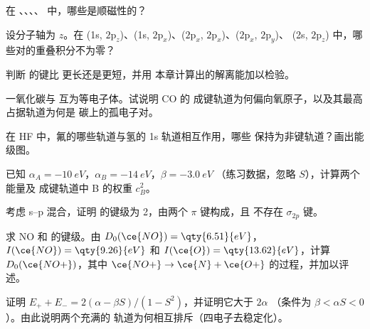 \begin{exercise}[$\star$]\label{exo:b2:diatomic-mos:3}
在 、、、、 中，哪些是顺磁性的？
\end{exercise}

\begin{exercise}[$\star$]\label{exo:b2:diatomic-mos:4}
设分子轴为 $z$。在 (1s, $2\mathrm p_z$)、(1s,
$2\mathrm p_x$)、($2\mathrm p_x$, $2\mathrm p_x$)、($2\mathrm p_x$, $2\mathrm p_y$)、
(2s, $2\mathrm p_z$) 中，哪些对的重叠积分不为零？
\end{exercise}

\begin{exercise}[$\star\star$]\label{exo:b2:diatomic-mos:5}
判断  的键比  更长还是更短，并用
本章计算出的解离能加以检验。
\end{exercise}

\begin{exercise}[$\star\star$]\label{exo:b2:diatomic-mos:6}
一氧化碳与  互为等电子体。试说明 CO 的
成键轨道为何偏向氧原子，以及其最高占据轨道为何是
碳上的孤电子对。
\end{exercise}

\begin{exercise}[$\star\star$]\label{exo:b2:diatomic-mos:7}
在 HF 中，氟的哪些轨道与氢的 1s 轨道相互作用，哪些
保持为非键轨道？画出能级图。
\end{exercise}

\begin{exercise}[$\star\star$]\label{exo:b2:diatomic-mos:8}
已知 $\alpha_A = \qty{-10}{eV}$，$\alpha_B = \qty{-14}{eV}$，$\beta = \qty{-3.0}{eV}$
（练习数据，忽略 $S$），计算两个能量及
成键轨道中 B 的权重 $c_B^2$。
\end{exercise}

\begin{exercise}[$\star\star$]\label{exo:b2:diatomic-mos:9}
考虑 s--p 混合，证明  的键级为 2，由两个 $\pi$ 键构成，且
不存在 $\sigma_{2p}$ 键。
\end{exercise}

\begin{exercise}[$\star\star\star$]\label{exo:b2:diatomic-mos:10}
求 NO 和  的键级。由 $D_0(\ce{NO}) = \qty{6.51}{eV}$，$I(\ce{NO}) =
\qty{9.26}{eV}$ 和 $I(\ce{O}) = \qty{13.62}{eV}$，计算 $D_0(\ce{NO+})$，其中 $\ce{NO+} \to
\ce{N} + \ce{O+}$ 的过程，并加以评述。
\end{exercise}

\begin{exercise}[$\star\star\star$]\label{exo:b2:diatomic-mos:11}
证明 $E_+ + E_- = 2(\alpha - \beta S)/(1 - S^2)$，并证明它大于 $2\alpha$
（条件为 $\beta < \alpha S < 0$）。由此说明两个充满的
轨道为何相互排斥（四电子去稳定化）。
\end{exercise}

